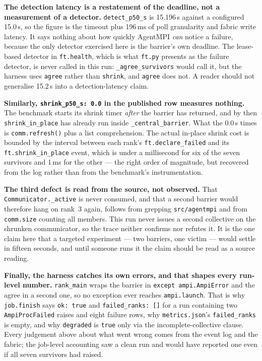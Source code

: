 \documentclass[11pt]{article}
\begin{document}
\textbf{The detection latency is a restatement of the deadline, not a measurement of a
detector.} \texttt{detect\_p50\_s} is 15.196\,s against a configured 15.0\,s, so the
figure is the timeout plus 196\,ms of poll granularity and fabric write latency. It says
nothing about how quickly AgentMPI \emph{can} notice a failure, because the only detector
exercised here is the barrier's own deadline. The lease-based detector in
\texttt{ft.health}, which is what \texttt{ft.py} presents as the failure detector, is
never called in this run: \texttt{\_agree\_survivors} would call it, but the harness uses
\texttt{agree} rather than \texttt{shrink}, and \texttt{agree} does not. A reader should
not generalise 15.2\,s into a detection-latency claim.

\textbf{Similarly, \texttt{shrink\_p50\_s: 0.0} in the published row measures nothing.}
The benchmark starts its shrink timer \emph{after} the barrier has returned, and by then
\texttt{shrink\_in\_place} has already run inside \texttt{\_central\_barrier}. What the
0.0\,s times is \texttt{comm.refresh()} plus a list comprehension. The actual in-place
shrink cost is bounded by the interval between each rank's \texttt{ft.declare\_failed} and
its \texttt{ft.shrink\_in\_place} event, which is under a millisecond for six of the seven
survivors and 1\,ms for the other --- the right order of magnitude, but recovered from the
log rather than from the benchmark's instrumentation.

\textbf{The third defect is read from the source, not observed.} That
\texttt{Communicator.\_active} is never consumed, and that a second barrier would
therefore hang on rank~3 again, follows from grepping \texttt{src/agentmpi} and from
\texttt{comm.size} counting all members. This run never issues a second collective on the
shrunken communicator, so the trace neither confirms nor refutes it. It is the one claim
here that a targeted experiment --- two barriers, one victim --- would settle in fifteen
seconds, and until someone runs it the claim should be read as a source reading.

\textbf{Finally, the harness catches its own errors, and that shapes every run-level
number.} \texttt{rank\_main} wraps the barrier in \texttt{except ampi.AmpiError} and the
agree in a second one, so no exception ever reaches \texttt{ampi.launch}. That is why
\texttt{job.finish} says \texttt{ok: true} and \texttt{failed\_ranks: []} for a run
containing two \texttt{AmpiProcFailed} raises and eight failure rows, why
\texttt{metrics.json}'s \texttt{failed\_ranks} is empty, and why \texttt{degraded} is
\texttt{true} only via the incomplete-collective clause. Every judgement above about what
went wrong comes from the event log and the fabric; the job-level accounting saw a clean
run and would have reported one even if all seven survivors had raised.
\end{document}
